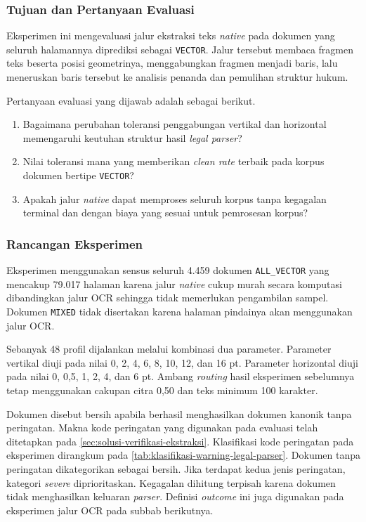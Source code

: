\subsubsection{Tujuan dan Pertanyaan Evaluasi}
\label{sec:tujuan-evaluasi-legal-parser-vector}

Eksperimen ini mengevaluasi jalur ekstraksi teks \textit{native} pada dokumen yang seluruh halamannya diprediksi sebagai \texttt{VECTOR}.
Jalur tersebut membaca fragmen teks beserta posisi geometrinya, menggabungkan fragmen menjadi baris, lalu meneruskan baris tersebut ke analisis penanda dan pemulihan struktur hukum.

Pertanyaan evaluasi yang dijawab adalah sebagai berikut.

\begin{enumerate}
  \item Bagaimana perubahan toleransi penggabungan vertikal dan horizontal memengaruhi keutuhan struktur hasil \textit{legal parser}?
  \item Nilai toleransi mana yang memberikan \textit{clean rate} terbaik pada korpus dokumen bertipe \texttt{VECTOR}?
  \item Apakah jalur \textit{native} dapat memproses seluruh korpus tanpa kegagalan terminal dan dengan biaya yang sesuai untuk pemrosesan korpus?
\end{enumerate}

\subsubsection{Rancangan Eksperimen}
\label{sec:rancangan-legal-parser-vector}

Eksperimen menggunakan sensus seluruh 4.459 dokumen \texttt{ALL\_VECTOR} yang mencakup 79.017 halaman karena jalur \textit{native} cukup murah secara komputasi dibandingkan jalur OCR sehingga tidak memerlukan pengambilan sampel.
Dokumen \texttt{MIXED} tidak disertakan karena halaman pindainya akan menggunakan jalur OCR.

Sebanyak 48 profil dijalankan melalui kombinasi dua parameter.
Parameter vertikal  diuji pada nilai 0, 2, 4, 6, 8, 10, 12, dan 16 pt.
Parameter horizontal  diuji pada nilai 0, 0,5, 1, 2, 4, dan 6 pt.
Ambang \textit{routing} hasil eksperimen sebelumnya tetap menggunakan cakupan citra 0,50 dan teks minimum 100 karakter.

Dokumen disebut bersih apabila berhasil menghasilkan dokumen kanonik tanpa peringatan.
Makna kode peringatan yang digunakan pada evaluasi telah ditetapkan pada \autoref{sec:solusi-verifikasi-ekstraksi}.
Klasifikasi kode peringatan pada eksperimen dirangkum pada \autoref{tab:klasifikasi-warning-legal-parser}.
Dokumen tanpa peringatan dikategorikan sebagai bersih.
Jika terdapat kedua jenis peringatan, kategori \textit{severe} diprioritaskan.
Kegagalan dihitung terpisah karena dokumen tidak menghasilkan keluaran \textit{parser}.
Definisi \textit{outcome} ini juga digunakan pada eksperimen jalur OCR pada subbab berikutnya.

